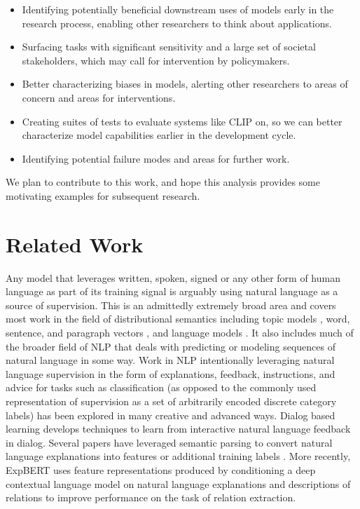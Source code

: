 \begin{itemize}
  \item Identifying potentially beneficial downstream uses of models early in the research process, enabling other researchers to think about applications.
  \item Surfacing tasks with significant sensitivity and a large set of societal stakeholders, which may call for intervention by policymakers.
  \item Better characterizing biases in models, alerting other researchers to areas of concern and areas for interventions.
  \item Creating suites of tests to evaluate systems like CLIP on, so we can better characterize model capabilities earlier in the development cycle.
  \item Identifying potential failure modes and areas for further work.
\end{itemize}

We plan to contribute to this work, and hope this analysis provides some motivating examples for subsequent research.

\section{Related Work}

Any model that leverages written, spoken, signed or any other form of human language as part of its training signal is arguably using natural language as a source of supervision. This is an admittedly extremely broad area and covers most work in the field of distributional semantics including topic models \citep{blei2003latent}, word, sentence, and paragraph vectors \citep{mikolov2013distributed,kiros2015skip,le2014distributed}, and language models \citep{bengio2003neural}. It also includes much of the broader field of NLP that deals with predicting or modeling sequences of natural language in some way. Work in NLP intentionally leveraging natural language supervision in the form of explanations, feedback, instructions, and advice for tasks such as classification (as opposed to the commonly used representation of supervision as a set of arbitrarily encoded discrete category labels) has been explored in many creative and advanced ways. Dialog based learning \citep{weston2016dialog,li2016learning,hancock2019learning} develops techniques to learn from interactive natural language feedback in dialog. Several papers have leveraged semantic parsing to convert natural language explanations into features \citep{srivastava2017joint} or additional training labels \citep{hancock2018training}. More recently, ExpBERT \citep{murty2020expbert} uses feature representations produced by conditioning a deep contextual language model on natural language explanations and descriptions of relations to improve performance on the task of relation extraction.


